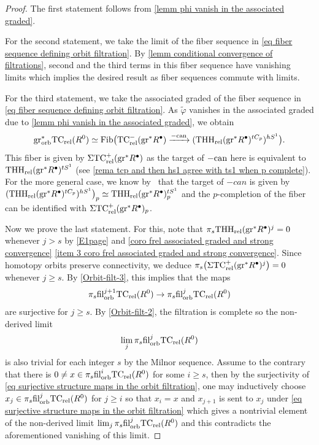 \documentclass[english,10pt]{amsart}
\newcommand{\rel}{\textup{rel}}
\theoremstyle{definition}
\numberwithin{equation}{section}
\newcommand{\rntc}{\mathrm{TC}_{\rel}^{-}}
\newcommand{\rtc}{\mathrm{TC}_{\rel}}
\newcommand{\rthh}{\mathrm{THH}_{\rel}}
\newcommand{\rtcpl}{\mathrm{TC}_{\rel}^+}
\newcommand{\filorbi}{\ensuremath{\mathrm{fil}}^i_{\textup{orb}}}
\newcommand{\grorbast}{\mathrm{gr}_{\textup{orb}}^*}
\newcommand{\filorbj}{\ensuremath{\textup{fil}}^j_{\textup{orb}}}
\newcommand{\filorbjplusone}{\ensuremath{\textup{fil}}^{j+1}_{\textup{orb}}}
\newcommand{\gr}{\textup{gr}^*}
\begin{document}
\begin{proof}
The first statement follows from \autoref{lemm phi vanish in the associated graded}. 

For the second statement, we take the limit of  the fiber sequence in \eqref{eq fiber sequence defining orbit filtration}. By \autoref{lemm conditional convergence of filtrations}, second and the third terms in this fiber sequence have vanishing limits which implies the desired result as fiber sequences commute with limits.

For the third statement, we take the associated graded of the fiber sequence in \eqref{eq fiber sequence defining orbit filtration}. As $\widetilde{\varphi}$ vanishes in the associated graded due to \autoref{lemm phi vanish in the associated graded}, we obtain 
\begin{equation}\label{eq associated graded of the orbit filtration}
\grorbast \rtc(R^0) \simeq \textup{Fib}\big(\rntc(\gr R^{\bullet}) \xrightarrow{-\textup{can}} (\rthh(\gr R^{\bullet})^{tC_p})^{hS^1}\big).
\end{equation}
This fiber is given by $\Sigma \rtcpl(\gr R^{\bullet})$ as the target of $-\textup{can}$ here is equivalent to $\rthh(\gr R^{\bullet})^{tS^1}$ (see \autoref{rema tcp and then hs1 agree with ts1 when p complete}). For the more general case, we know by~\cite[Lemma~II.4.2]{nikolausscholze2018topologicalcyclic} that the target of $-can$ is given by  $(\rthh(\gr R^{\bullet})^{tC_p})^{hS^1}\big)_p\simeq \rthh(\gr R^{\bullet})^{tS^1}_p$ and the $p$-completion of the fiber can be identified with $\Sigma\mathrm{TC}^+_\rel(\gr R^{\bullet})_p$. 

Now we prove the last statement. For this, note that $\pi_s \rthh(\gr R^{\bullet})^j = 0$ whenever $j >s$  by \autoref{E1page} and \autoref{coro frel associated graded and strong convergence} \eqref{item 3 coro frel associated graded and strong convergence}. Since homotopy orbits preserve connectivity, we deduce $\pi_{s} \big(\Sigma \rtcpl (\gr R^{\bullet})^j\big) = 0$ whenever $j\geq s$. By \eqref{Orbit-filt-3}, this implies that the maps
\begin{equation}\label{eq surjective structure maps in the orbit filtration}
\pi_s \filorbjplusone
\rtc(R^0)\to \pi_s \filorbj \rtc(R^0)\end{equation}
are surjective  for $j\geq s$. By \eqref{Orbit-filt-2}, the filtration is complete so the non-derived limit
\[\lim_j \pi_s \filorbj \rtc(R^0)\]
 is also trivial for each integer $s$ by the Milnor sequence. Assume to the contrary that there is $0 \neq x \in \pi_s \filorbi \rtc(R^0)$ for some $i \geq s$, then by the surjectivity of \eqref{eq surjective structure maps in the orbit filtration}, one may inductively choose $x_j \in \pi_s \filorbj \rtc(R^0)$ for $j \geq i$ so that $x_i = x$ and $x_{j+1}$ is sent to $x_j$ under \eqref{eq surjective structure maps in the orbit filtration} which gives a nontrivial element of the non-derived limit $\lim_j \pi_s \filorbj \rtc(R^0)$ and this  contradicts the aforementioned vanishing of this limit.
\end{proof}
\end{document}
